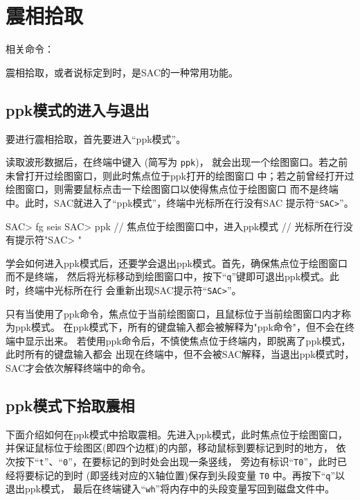 \section{震相拾取}
\label{sec:phase-picking}
相关命令：

震相拾取，或者说标定到时，是SAC的一种常用功能。

\subsection{ppk模式的进入与退出}
要进行震相拾取，首先要进入``ppk模式''。

读取波形数据后，在终端中键入 (简写为 \texttt{ppk})，
就会出现一个绘图窗口。若之前未曾打开过绘图窗口，则此时焦点位于ppk打开的绘图窗口
中；若之前曾经打开过绘图窗口，则需要鼠标点击一下绘图窗口以使得焦点位于绘图窗口
而不是终端中。此时，SAC就进入了``ppk模式''，终端中光标所在行没有SAC
提示符``\texttt{SAC>}''。

\begin{SACCode}
SAC> fg seis
SAC> ppk    // 焦点位于绘图窗口中，进入ppk模式
            // 光标所在行没有提示符"SAC> "
\end{SACCode}

学会如何进入ppk模式后，还要学会退出ppk模式。首先，确保焦点位于绘图窗口而不是终端，
然后将光标移动到绘图窗口中，按下``\texttt{q}''键即可退出ppk模式。此时，终端中光标所在行
会重新出现SAC提示符``\texttt{SAC>}''。

\begin{note}
只有当使用了ppk命令，焦点位于当前绘图窗口，且鼠标位于当前绘图窗口内才称为ppk模式。
在ppk模式下，所有的键盘输入都会被解释为"ppk命令"，但不会在终端中显示出来。
若使用ppk命令后，不慎使焦点位于终端内，即脱离了ppk模式，此时所有的键盘输入都会
出现在终端中，但不会被SAC解释，当退出ppk模式时，SAC才会依次解释终端中的命令。
\end{note}

\subsection{ppk模式下拾取震相}
下面介绍如何在ppk模式中拾取震相。先进入ppk模式，此时焦点位于绘图窗口，
并保证鼠标位于绘图区(即四个边框)的内部，移动鼠标到要标记到时的地方，
依次按下``\texttt{t}''、``\texttt{0}''，在要标记的到时处会出现一条竖线，
旁边有标识``\texttt{T0}''，此时已经将要标记的到时
(即竖线对应的X轴位置)保存到头段变量 \texttt{T0} 中。再按下``\texttt{q}''以退出ppk模式，
最后在终端键入``\texttt{wh}''将内存中的头段变量写回到磁盘文件中。

